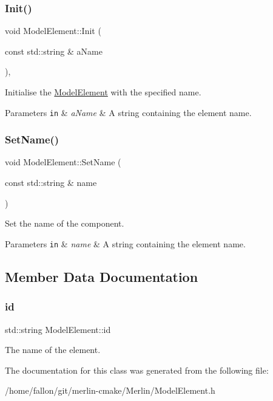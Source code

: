 \subsubsection{\texorpdfstring{Init()}{Init()}}
{\footnotesize\ttfamily void Model\+Element\+::\+Init (\begin{DoxyParamCaption}\item[{const std\+::string \&}]{a\+Name }\end{DoxyParamCaption})\hspace{0.3cm}{\ttfamily [inline]}, {\ttfamily [protected]}}

Initialise the \hyperlink{classModelElement}{Model\+Element} with the specified name. 
\begin{DoxyParams}[1]{Parameters}
\mbox{\tt in}  & {\em a\+Name} & A string containing the element name. \\
\hline
\end{DoxyParams}
\mbox{\label{classModelElement_a6ee25b15570805484cdde49e66b910de}} 
\subsubsection{\texorpdfstring{Set\+Name()}{SetName()}}
{\footnotesize\ttfamily void Model\+Element\+::\+Set\+Name (\begin{DoxyParamCaption}\item[{const std\+::string \&}]{name }\end{DoxyParamCaption})\hspace{0.3cm}{\ttfamily [inline]}}

Set the name of the component. 
\begin{DoxyParams}[1]{Parameters}
\mbox{\tt in}  & {\em name} & A string containing the element name. \\
\hline
\end{DoxyParams}


\subsection{Member Data Documentation}
\mbox{\label{classModelElement_aada171ead2085c75b592cf07d91bc5c2}} 
\subsubsection{\texorpdfstring{id}{id}}
{\footnotesize\ttfamily std\+::string Model\+Element\+::id\hspace{0.3cm}{\ttfamily [protected]}}

The name of the element. 

The documentation for this class was generated from the following file\+:\begin{DoxyCompactItemize}
\item 
/home/fallon/git/merlin-\/cmake/\+Merlin/Model\+Element.\+h\end{DoxyCompactItemize}
